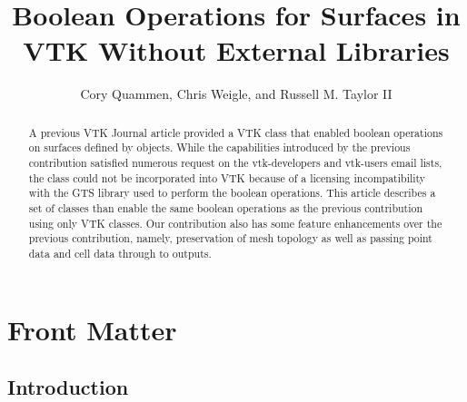 \documentclass{InsightArticle}
\title{Boolean Operations for Surfaces in VTK Without External Libraries}
\author{Cory Quammen, Chris Weigle, and Russell M. Taylor II}
\newcommand{\IJhandlerIDnumber}{1338}
\begin{document}
%
% 
\IJhandlefooter{\IJhandlerIDnumber}


\ifpdf
\else
\fi


\maketitle


\ifhtml
\chapter*{Front Matter\label{front}}
\fi


\begin{abstract}
\noindent
A previous VTK Journal article provided a VTK class that enabled boolean operations on surfaces defined by  objects. While the capabilities introduced by the previous contribution satisfied numerous request on the vtk-developers and vtk-users email lists, the class could not be incorporated into VTK because of a licensing incompatibility with the GTS library used to perform the boolean operations. This article describes a set of classes than enable the same boolean operations as the previous contribution using only VTK classes. Our contribution also has some feature enhancements over the previous contribution, namely, preservation of mesh topology as well as passing point data and cell data through to outputs.

\end{abstract}

\IJhandlenote{\IJhandlerIDnumber}

\tableofcontents

\section{Introduction}
\end{document}
